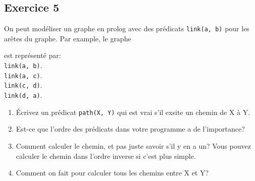 \subsection*{Exercice 5}
On peut mod\'{e}liser un graphe en prolog avec des pr\'{e}dicats \texttt{link(a, b)} pour les ar\^{e}tes du graphe. Par example,
le graphe
\begin{center}
\end{center}
est repr\'{e}sent\'{e} par: \\

\noindent \texttt{link(a, b)}. \\
\texttt{link(a, c)}. \\
\texttt{link(c, d)}. \\
\texttt{link(d, a)}.

\begin{enumerate}
 \item \'{E}crivez un pr\'{e}dicat \texttt{path(X, Y)} qui est vrai s'il exsite un chemin de X \`{a} Y.
 \item Est-ce que l'ordre des pr\'{e}dicats dans votre programme a de l'importance?
 \item Comment calculer le chemin, et pas juste savoir s'il y en a un? Vous pouvez calculer le
 chemin dans l'ordre inverse si c'est plus simple.
 \item Comment on fait pour calculer tous les chemins entre X et Y?
\end{enumerate}

